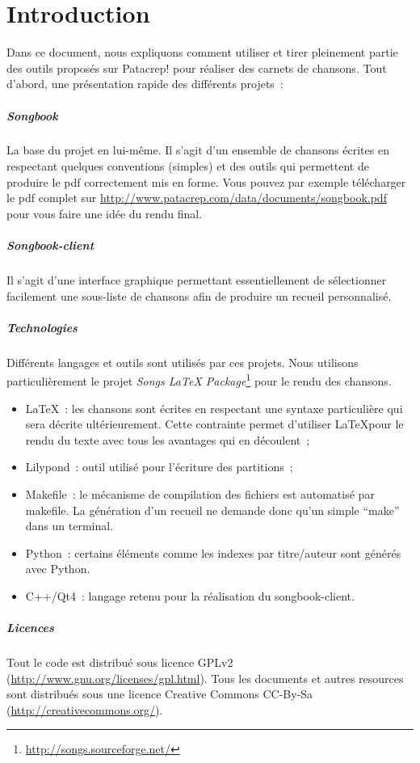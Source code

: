 \chapter*{Introduction}
\minitoc
\label{chap:introduction}

Dans ce document, nous expliquons comment utiliser et tirer pleinement
partie des outils proposés sur Patacrep! pour réaliser des carnets de
chansons. Tout d'abord, une présentation rapide des différents
projets~:

\paragraph{Songbook}
La base du projet en lui-même. Il s'agit d'un ensemble de chansons
écrites en respectant quelques conventions (simples) et des outils qui
permettent de produire le pdf correctement mis en forme. Vous pouvez
par exemple télécharger le pdf complet sur
\url{http://www.patacrep.com/data/documents/songbook.pdf} pour
vous faire une idée du rendu final.

\paragraph{Songbook-client} 
Il s'agit d'une interface graphique permettant essentiellement de
sélectionner facilement une sous-liste de chansons afin de produire un
recueil personnalisé.

\paragraph{Technologies} 
Différents langages et outils sont utilisés par ces projets. Nous
utilisons particulièrement le projet \emph{Songs LaTeX
Package}\footnote{\url{http://songs.sourceforge.net/}} pour le rendu
des chansons.

\begin{itemize}
\item \LaTeX~: les chansons sont écrites en respectant une syntaxe
  particulière qui sera décrite ultérieurement. Cette contrainte
  permet d'utiliser \LaTeX pour le rendu du texte avec tous les
  avantages qui en découlent~;
\item Lilypond~: outil utilisé pour l'écriture des partitions~;
\item Makefile~: le mécanisme de compilation des fichiers est
  automatisé par makefile.  La génération d'un recueil ne demande donc
  qu'un simple ``make'' dans un terminal.
\item Python~: certains éléments comme les indexes par titre/auteur
  sont générés avec Python.
\item C++/Qt4~: langage retenu pour la réalisation du songbook-client.
\end{itemize}

\paragraph{Licences}
Tout le code est distribué sous licence GPLv2
(\url{http://www.gnu.org/licenses/gpl.html}). Tous les documents et
autres resources sont distribués sous une licence Creative Commons
CC-By-Sa (\url{http://creativecommons.org/}).

